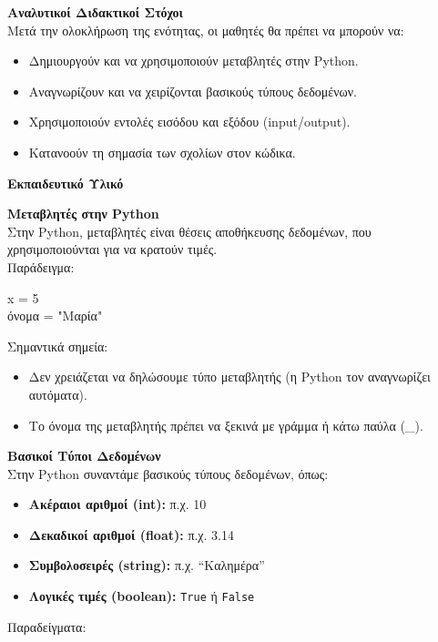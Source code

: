 \documentclass[11pt]{report}
\begin{document}
\vspace{1em}

\textbf{Αναλυτικοί Διδακτικοί Στόχοι} \\
Μετά την ολοκλήρωση της ενότητας, οι μαθητές θα πρέπει να μπορούν να:
\begin{itemize}
    \item Δημιουργούν και να χρησιμοποιούν μεταβλητές στην Python.
    \item Αναγνωρίζουν και να χειρίζονται βασικούς τύπους δεδομένων.
    \item Χρησιμοποιούν εντολές εισόδου και εξόδου (input/output).
    \item Κατανοούν τη σημασία των σχολίων στον κώδικα.
\end{itemize}

\vspace{1em}

\textbf{Εκπαιδευτικό Υλικό}

\textbf{Μεταβλητές στην Python} \\
Στην Python, μεταβλητές είναι θέσεις αποθήκευσης δεδομένων, που χρησιμοποιούνται για να κρατούν τιμές.\\
Παράδειγμα:

\begin{tcolorbox}[colback=gray!5!white, colframe=black!75!black]
x = 5 \\
όνομα = "Μαρία"
\end{tcolorbox}

Σημαντικά σημεία:
\begin{itemize}
    \item Δεν χρειάζεται να δηλώσουμε τύπο μεταβλητής (η Python τον αναγνωρίζει αυτόματα).
    \item Το όνομα της μεταβλητής πρέπει να ξεκινά με γράμμα ή κάτω παύλα (\_).
\end{itemize}

\vspace{1em}

\textbf{Βασικοί Τύποι Δεδομένων} \\
Στην Python συναντάμε βασικούς τύπους δεδομένων, όπως:

\begin{itemize}
    \item \textbf{Ακέραιοι αριθμοί (int):} π.χ. 10
    \item \textbf{Δεκαδικοί αριθμοί (float):} π.χ. 3.14
    \item \textbf{Συμβολοσειρές (string):} π.χ. ``Καλημέρα''
    \item \textbf{Λογικές τιμές (boolean):} \texttt{True} ή \texttt{False}
\end{itemize}
Παραδείγματα:
\end{document}
